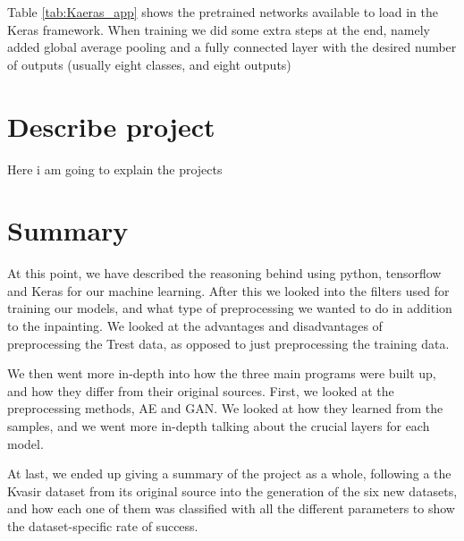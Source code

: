 Table \ref{tab:Kaeras_app} shows the pretrained networks available to load in the Keras framework. 
When training we did some extra steps at the end, namely added global average pooling and a fully connected layer with the desired number of outputs (usually eight classes, and eight outputs)




\section{Describe project}
Here i am going to explain the projects
\section{Summary}
At this point, we have described the reasoning behind using python, tensorflow and Keras for our machine learning. 
After this we looked into the filters used for training our models, and what type of preprocessing we wanted to do in addition to the inpainting. We looked at the advantages and disadvantages of preprocessing the Trest data, as opposed to just preprocessing the training data.

We then went more in-depth into how the three main programs were built up, and how they differ from their original sources.
First, we looked at the preprocessing methods, AE and GAN. We looked at how they learned from the samples, and we went more in-depth talking about the crucial layers for each model.

At last, we ended up giving a summary of the project as a whole, following a the Kvasir dataset from its original source into the generation of the six new datasets, and how each one of them was classified with all the different parameters to show the dataset-specific rate of success.

 

